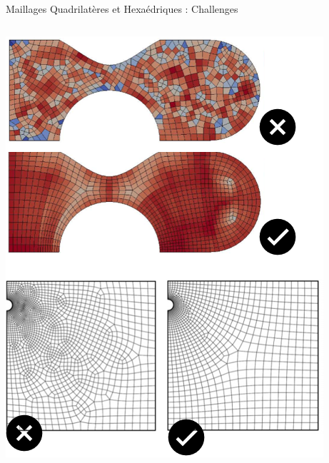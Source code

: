\begin{frame}{Maillages Quadrilatères et Hexaédriques : Challenges}
\begin{columns}[T]
        \begin{column}{.5\textwidth}
            \includegraphics[width=\linewidth]{img/new_images/qualite_maillage_important.PNG}
        \end{column}
    \end{columns}
\end{frame}

